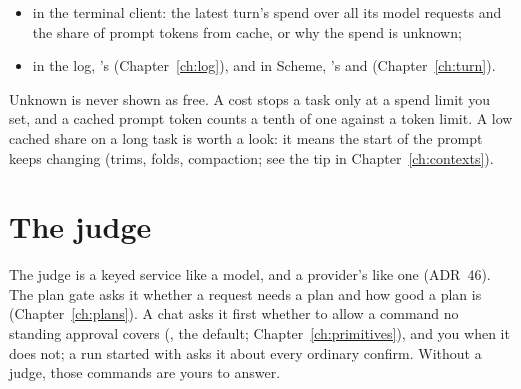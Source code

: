 \begin{itemize}
    cache or the budget's discounted token count. If history was truncated,
    the Totals label ``from the log that remains'' applies to the rate too
    (). A compact summary above every tab keeps three figures available:
    total spend, turn time and context fullness; the tool calls and the
    cache rate are in Statistics. The plan is pinned under the
    conversation, Workspace includes retained project notes, and the three
    tabs, above the content, stay on one
    row at both desktop panel widths, retaining visible keyboard focus.
    Navigation stays outside the desktop content's scroll area. A worktree
    task's Review button opens its actual branch diff in the centre; Home's
    Recently finished Review link does too. Unified is the default, with a
    Side-by-side option; Close review restores conversation/reply while
    retaining review drafts and reading position. Comments use current-file
    numbers in either layout, with whole-file comments for old-only deletions.
    Changes' approval previews and recovery stay separate; narrow screens
    stack normally, with split diffs scrolling inside their body rather than
    widening the page;
  \item {} in the terminal client: the latest turn's spend over
    all its model requests and the share of prompt tokens from cache, or
    why the spend is unknown;
  \item in the log, 's  (Chapter~\ref{ch:log}),
    and in Scheme, 's  and
     (Chapter~\ref{ch:turn}).
\end{itemize}

Unknown is never shown as free. A cost stops a task only at a spend limit
you set, and a cached prompt token counts a tenth of one against a token
limit. A low cached share on a long task is worth a look: it means the
start of the prompt keeps changing (trims, folds, compaction; see the tip
in Chapter~\ref{ch:contexts}).

\section{The judge}

The judge is a keyed service like a model, and a provider's like one
(ADR~46). The plan gate asks it whether a request needs a plan and how
good a plan is (Chapter~\ref{ch:plans}). A chat asks it first whether to
allow a command no standing approval covers (, the default; Chapter~\ref{ch:primitives}), and you when it does
not; a run started with  asks it about every ordinary
confirm. Without a judge, those commands are yours to answer.

